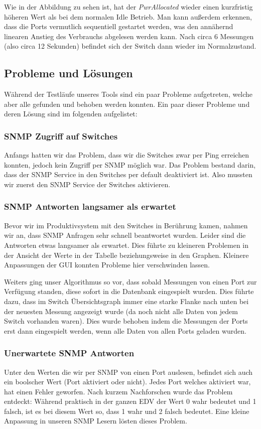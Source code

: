 Wie in der Abbildung zu sehen ist, hat der \textit{PwrAllocated} wieder einen kurzfristig höheren Wert als bei dem normalen Idle Betrieb. Man kann außerdem erkennen, dass die Ports vermutlich sequentiell gestartet werden, was den annähernd linearen Anstieg des Verbrauchs abgelesen werden kann. Nach circa 6 Messungen (also circa 12 Sekunden) befindet sich der Switch dann wieder im Normalzustand.

\subsection{Probleme und Lösungen}
Während der Testläufe unseres Tools sind ein paar Probleme aufgetreten, welche aber alle gefunden und behoben werden konnten. Ein paar dieser Probleme und deren Lösung sind im folgenden aufgelistet:

\subsubsection*{SNMP Zugriff auf Switches}
Anfangs hatten wir das Problem, dass wir die Switches zwar per Ping erreichen konnten, jedoch kein Zugriff per SNMP möglich war. Das Problem bestand darin, dass der SNMP Service in den Switches per default deaktiviert ist. Also mussten wir zuerst den SNMP Service der Switches aktivieren.

\subsubsection*{SNMP Antworten langsamer als erwartet}
Bevor wir im Produktivsystem mit den Switches in Berührung kamen, nahmen wir an, dass SNMP Anfragen sehr schnell beantwortet wurden. Leider sind die Antworten etwas langsamer als erwartet. Dies führte zu kleineren Problemen in der Ansicht der Werte in der Tabelle beziehungsweise in den Graphen. Kleinere Anpassungen der GUI konnten Probleme hier verschwinden lassen.

Weiters ging unser Algorithmus so vor, dass sobald Messungen von einen Port zur Verfügung standen, diese sofort in die Datenbank eingespielt wurden. Dies führte dazu, dass im Switch Übersichtsgraph immer eine starke Flanke nach unten bei der neuesten Messung angezeigt wurde (da noch nicht alle Daten von jedem Switch vorhanden waren). Dies wurde behoben indem die Messungen der Ports erst dann eingespielt werden, wenn alle Daten von allen Ports geladen wurden.

\subsubsection*{Unerwartete SNMP Antworten}
Unter den Werten die wir per SNMP von einen Port auslesen, befindet sich auch ein boolscher Wert (Port aktiviert oder nicht). Jedes Port welches aktiviert war, hat einen Fehler geworfen. Nach kurzem Nachforschen wurde das Problem entdeckt: Während praktisch in der ganzen EDV der Wert 0 wahr bedeutet und 1 falsch, ist es bei diesem Wert so, dass 1 wahr und 2 falsch bedeutet. Eine kleine Anpassung in unseren SNMP Lesern lösten dieses Problem.

